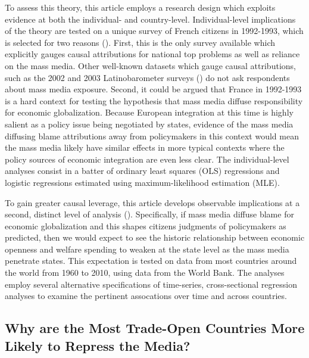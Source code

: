 \documentclass[12pt]{report}
\begin{document}
To assess this theory, this article employs a research design which exploits evidence at both the individual- and country-level. Individual-level implications of the theory are tested on a unique survey of French citizens in
1992-1993, which is selected for two reasons (\citealt{Chrique:1993us}). First, this is the only survey available which explicitly gauges causal attributions for national top problems as well as reliance on the mass media. Other well-known datasets which gauge causal attributions, such as the 2002 and 2003 Latinobarometer surveys (\citealt{Alcaniz:2010gb}) do not ask respondents about mass media exposure. Second, it could be argued that France in 1992-1993 is a hard context for testing the hypothesis that mass media diffuse responsibility for economic globalization. Because European integration at this time is highly salient as a policy issue being negotiated by states, evidence of the mass media diffusing blame attributions away from policymakers in this context would mean the mass media likely have similar effects in more typical contexts where the policy sources of economic integration are even less clear. The individual-level analyses consist in a batter of ordinary least squares (OLS) regressions and logistic regressions estimated using maximum-likelihood estimation (MLE).

To gain greater causal leverage, this article develops observable implications at a second, distinct level of analysis (\citealt[30]{king1994designing}). Specifically, if mass media diffuse blame for economic globalization and this shapes citizens judgments of policymakers as predicted, then we would expect to see the historic relationship between economic openness and welfare spending to weaken at the state level as the mass media penetrate states. This expectation is tested on data from most countries around the world from 1960 to 2010, using data from the World Bank. The analyses employ several alternative specifications of time-series, cross-sectional regression analyses to examine the pertinent assocations over time and across countries.

\subsection{Why are the Most Trade-Open Countries More Likely to Repress the Media?}
\end{document}
